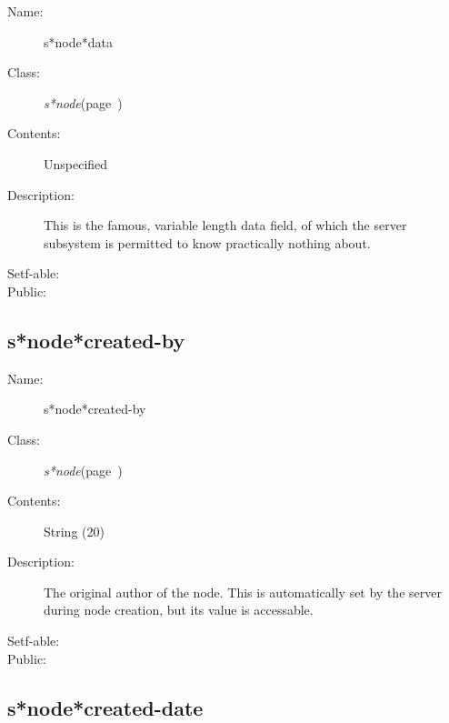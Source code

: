 \begin{description}

\item [Name:]  s*node*data

\item [Class:] {\sl s*node}\hfill(page~\pageref{s*node})

\item [Contents:]  Unspecified 

\item [Description:]
This is the famous, variable length data
field, of which the server subsystem is
permitted to know practically nothing about.

\item [Setf-able:]


\item [Public:]



\end{description}
\horizontalline

\subsection{s*node*created-by}
\label{s*node*created-by}

\begin{description}

\item [Name:]  s*node*created-by

\item [Class:] {\sl s*node}\hfill(page~\pageref{s*node})

\item [Contents:] String (20)

\item [Description:]

The original author of the node.  This is 
automatically set by the server during 
node creation, but its value is accessable.

\item [Setf-able:]


\item [Public:]



\end{description}
\horizontalline

\subsection{s*node*created-date}
\label{s*node*created-date}

